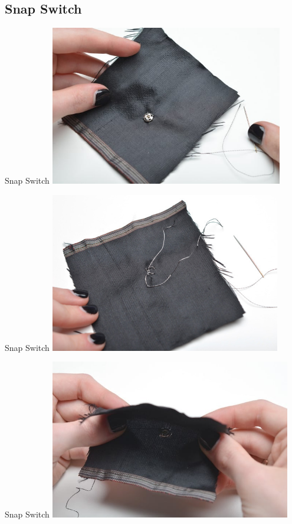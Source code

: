 \documentclass[aspectratio=169]{beamer}
\begin{document}
\subsection{Snap Switch}
\begin{frame}[fragile]{Snap Switch}
\includegraphics[height=2.75in]{flora-angler-embroidery-17.jpg}
\end{frame}
\begin{frame}[fragile]{Snap Switch}
\includegraphics[height=2.75in]{flora-angler-embroidery-18.jpg}
\end{frame}
\begin{frame}[fragile]{Snap Switch}
\includegraphics[height=2.75in]{flora-angler-embroidery-19.jpg}
\end{frame}
\end{document}
